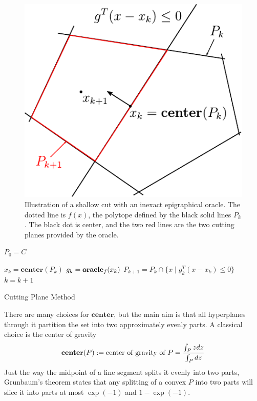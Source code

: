 \begin{figure} 
\begin{centering}
\includegraphics[scale=1.1]{cutting/cuttingregular.pdf}
\par\end{centering}
\caption{Illustration of a shallow cut with an inexact epigraphical oracle. The dotted
line is $f(x)$, the polytope defined by the black solid lines $P_k$. The black
dot is center, and the two red lines are the two cutting planes provided by the 
oracle.} \label{fig:approx-oracle}
\end{figure}

\begin{algorithm} 
  \SetAlgoNoLine
  \DontPrintSemicolon
  $P_0 = C$\;
  
   {
  \nl $x_{k}  = \mathbf{center}(P_k)$\;
  \nl $g_k = \mbox{\bf oracle}_f(x_k)$\;
  \nl $P_{k+1} = P_k \cap \{x \mid g_k^T(x -x_k) \leq 0 \}$\;
  \nl $k = k + 1$
  }
  \caption{Cutting Plane Method \label{alg:cutting_plane}}
\end{algorithm}

There are many choices for $\mathbf{center}$, but the main aim is that all
hyperplanes through it partition the set into two approximately
evenly parts. A classical choice is the center of gravity
$$
\mbox{\bf center}(P) := \mbox{center of gravity of $P$} = \frac{\int_P z dz}{\int_P dz}
$$
Just the way the midpoint of a line segment
splits it evenly into two parts, Grunbaum's theorem states that
any splitting of a convex $P$ into two parts will slice it into parts
at most $\exp(-1)$ and $1- \exp(-1)$.


